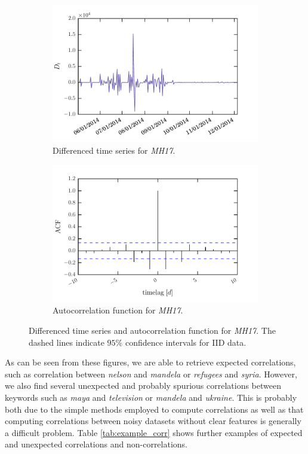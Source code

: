 \documentclass[12pt, a4paper]{article}
\begin{document}
\begin{figure}
\centering
\begin{subfigure}{.5\textwidth}
  \centering
  \includegraphics[width=.9\linewidth]{figs/mh17_diff.pdf}
  \caption{Differenced time series for \textit{MH17}.}
\end{subfigure}%
\begin{subfigure}{.5\textwidth}
  \centering
  \includegraphics[width=.9\linewidth]{figs/mh17_acf.pdf}
  \caption{Autocorrelation function for \textit{MH17}.}
\end{subfigure}
\caption{Differenced time series and autocorrelation function for \textit{MH17}. The dashed lines indicate $95 \%$ confidence intervals for IID data.}
\label{fig:diff_acf}
\end{figure}

As can be seen from these figures, we are able to retrieve expected correlations, such as correlation between \textit{nelson} and \textit{mandela} or \textit{refugees} and \textit{syria}. However, we also find several unexpected and probably spurious correlations between keywords such as \textit{maya} and \textit{television} or \textit{mandela} and \textit{ukraine}. 
This is probably both due to the simple methods employed to compute correlations as well as that computing correlations between noisy datasets without clear features is generally a difficult problem. Table \ref{tab:example_corr} shows further examples of expected and unexpected correlations and non-correlations.
\end{document}
